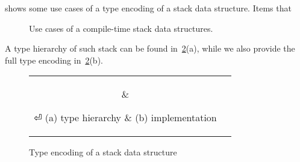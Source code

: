 

 shows some use cases of a type encoding of a stack data structure. 
Items that 



\begin{figure}[htb]
  \caption{\label{Figure:stack-use-cases}%
    Use cases of a compile-time stack data structures.
  }
\end{figure}

A type hierarchy of such stack can be found in~\cref{Figure:stack:encoding}(a),
  while we also provide the full \Java type encoding in~\cref{Figure:stack:encoding}(b).

\begin{figure}[htb]
  \caption{\label{Figure:stack:encoding} Type encoding of a stack data structure}
    \begin{tabular}{cc}
      \hspace{-12ex}
      \parbox[c]{0.3\linewidth}{%
        
      }
      &
      \hspace{1ex}
      \parbox[c]{0.86\linewidth}{%
      }
⏎
      \hspace{-12ex} (a) type hierarchy & (b) implementation
    \end{tabular}
\end{figure}

